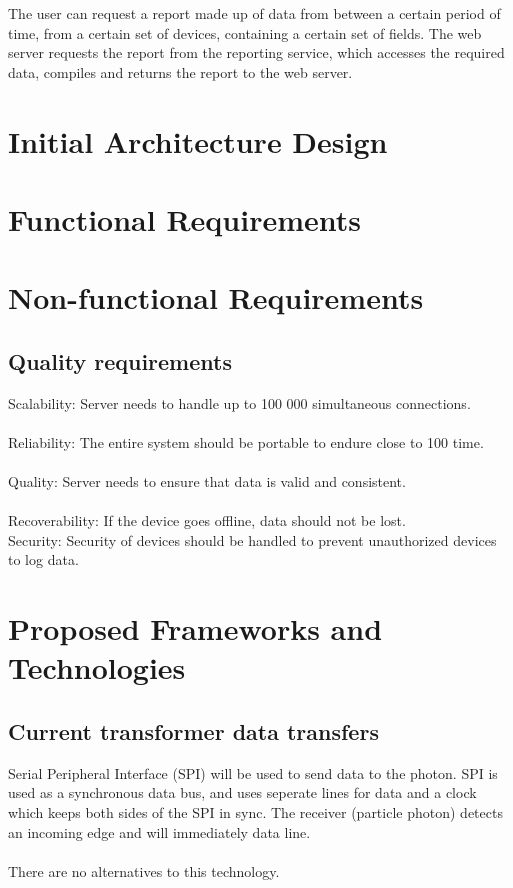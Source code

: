 \documentclass[paper=a4, fontsize=11pt]{scrartcl} %
\begin{document}
	The user can request a report made up of data from between a certain period of time, from a certain set of devices, containing a certain set of fields. The web server requests the report from the reporting service, which accesses the required data, compiles and returns the report to the web server.
	\newpage
	\section{Initial Architecture Design}
	\newpage
	\section{Functional Requirements}
	\newpage
	\section{Non-functional Requirements}
	\subsection{Quality requirements}
	Scalability: Server needs to handle up to 100 000 simultaneous connections.\\
	\\Reliability: The entire system should be portable to endure close to 100%
	time.\\
	\\Quality: Server needs to ensure that data is valid and consistent.\\
	\\Recoverability: If the device goes offline, data should not be lost.\\
	Security: Security of devices should be handled to prevent unauthorized
	devices to log data.
	\newpage
	\section{Proposed Frameworks and Technologies}
	\subsection{Current transformer data transfers}
	Serial Peripheral Interface (SPI) will be used to send data to the photon. SPI is used as a synchronous data bus,
	and uses seperate lines for data and a clock which keeps both sides of the SPI in sync. The receiver (particle photon) detects an incoming 
	edge and will immediately data line.\\
	\\There are no alternatives to this technology.
\end{document}
